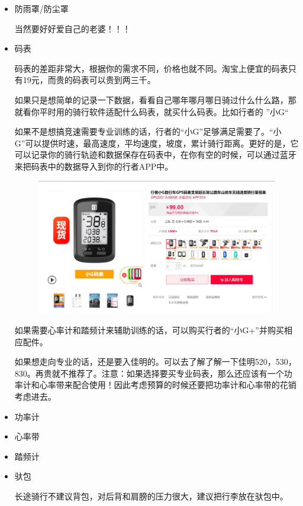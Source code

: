 \documentclass{ctexbook}
\begin{document}
\begin{itemize}
        \item 防雨罩/防尘罩
        
        当然要好好爱自己的老婆！！！
        \item 码表
    
        码表的差距非常大，根据你的需求不同，价格也就不同。淘宝上便宜的码表只有19元，而贵的码表可以贵到两三千。
        
        如果只是想简单的记录一下数据，看看自己哪年哪月哪日骑过什么什么路，那就看你平时用的骑行软件适配什么码表，就买什么码表。比如行者的 ''小G``

        如果不是想搞竞速需要专业训练的话，行者的“小G”足够满足需要了。“小G”可以提供时速，最高速度，平均速度，坡度，累计骑行距离。更好的是，它可以记录你的骑行轨迹和数据保存在码表中，在你有空的时候，可以通过蓝牙来把码表中的数据导入到你的行者APP中。

        \begin{figure}[H]
            \centering
            \includegraphics[width=0.7\linewidth]{fig/小G}
            \caption{}
        \end{figure}
        
        如果需要心率计和踏频计来辅助训练的话，可以购买行者的“小G+”并购买相应配件。

        
        如果想走向专业的话，还是要入佳明的。可以去了解了解一下佳明520，530，830。再贵就不推荐了。注意：如果选择要买专业码表，那么还应该有一个功率计和心率带来配合使用！因此考虑预算的时候还要把功率计和心率带的花销考虑进去。
        \item 功率计
        
        \item 心率带
        
        \item 踏频计
        
        \item 驮包 

        长途骑行不建议背包，对后背和肩膀的压力很大，建议把行李放在驮包中。
    

\end{itemize}
\end{document}
